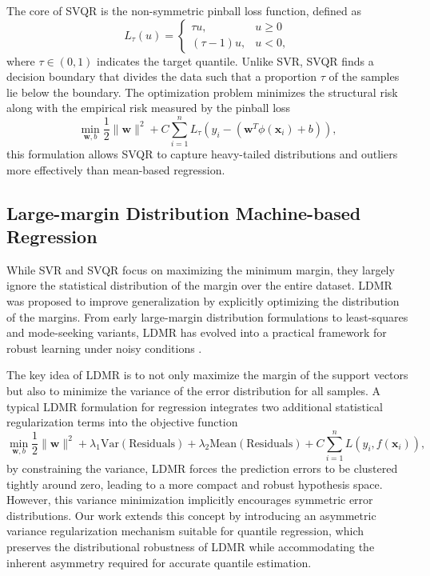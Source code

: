 \documentclass[a4paper]{cas-sc}
\begin{document}
The core of SVQR is the non-symmetric pinball loss function, defined as
\begin{equation}
L_{\tau}(u) = \begin{cases} 
\tau u, & u \ge 0 \\ 
(\tau - 1) u, & u < 0 ,
\end{cases}
\end{equation}
where $\tau \in (0,1)$ indicates the target quantile. Unlike SVR, SVQR finds a decision boundary that divides the data such that a proportion $\tau$ of the samples lie below the boundary. The optimization problem minimizes the structural risk along with the empirical risk measured by the pinball loss
\begin{equation}
\min_{\boldsymbol{w}, b} \frac{1}{2} \|\boldsymbol{w}\|^2 + C \sum_{i=1}^{n} L_{\tau}(y_i - (\boldsymbol{w}^T \phi(\boldsymbol{x}_i) + b)),
\end{equation}
this formulation allows SVQR to capture heavy-tailed distributions and outliers more effectively than mean-based regression.

\subsection{Large-margin Distribution Machine-based Regression}
While SVR and SVQR focus on maximizing the minimum margin, they largely ignore the statistical distribution of the margin over the entire dataset. LDMR was proposed to improve generalization by explicitly optimizing the distribution of the margins.
From early large-margin distribution formulations to least-squares and mode-seeking variants, LDMR has evolved into a practical framework for robust learning under noisy conditions \citep{zhang2014large, zhang2019optimal, gupta2021least, hazarika2023mode}.

The key idea of LDMR is to not only maximize the margin of the support vectors but also to minimize the variance of the error distribution for all samples. A typical LDMR formulation for regression integrates two additional statistical regularization terms into the objective function
\begin{equation}
\label{eq:ldmr_concept}
\min_{\boldsymbol{w}, b} \frac{1}{2} \|\boldsymbol{w}\|^2 + \lambda_1 \text{Var}(\text{Residuals}) + \lambda_2 \text{Mean}(\text{Residuals}) + C \sum_{i=1}^{n} L(y_i, f(\boldsymbol{x}_i)),
\end{equation}
by constraining the variance, LDMR forces the prediction errors to be clustered tightly around zero, leading to a more compact and robust hypothesis space. However, this variance minimization implicitly encourages symmetric error distributions. Our work extends this concept by introducing an asymmetric variance regularization mechanism suitable for quantile regression, which preserves the distributional robustness of LDMR while accommodating the inherent asymmetry required for accurate quantile estimation.
\end{document}
